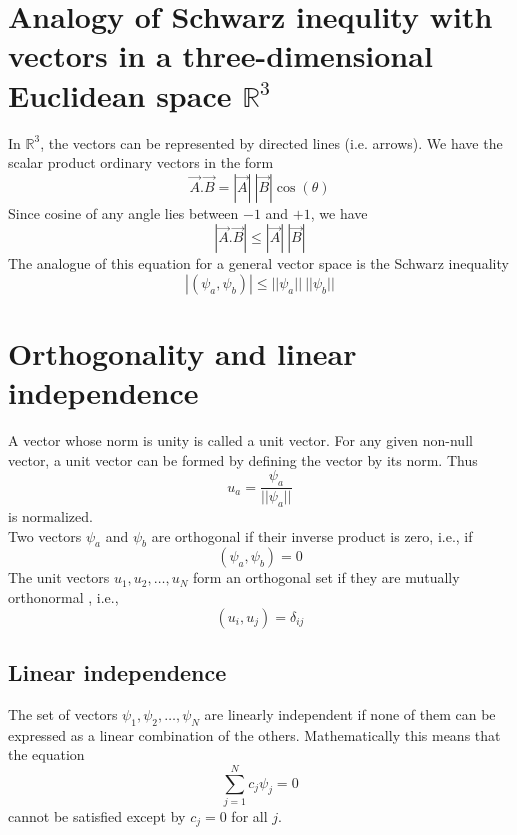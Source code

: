 \section{Analogy of Schwarz inequlity with vectors in a three-dimensional Euclidean space \texorpdfstring{$\mathbb{R}^3$}{Lg}}
In $\mathbb{R}^3$, the vectors can be represented by directed lines (i.e. arrows). We have the scalar product ordinary vectors in the form
\begin{equation}\label{eqn:2.65}
\vec{A} . \vec{B} = |\vec{A}| \ |\vec{B}| \cos(\theta)
\end{equation}
Since cosine of any angle lies between $-1$ and $+1$, we have
\begin{equation}\label{eqn:2.66}
|\vec{A} . \vec{B} | \leq |\vec{A}| \ |\vec{B}|
\end{equation}
The analogue of this equation for a general vector space is the Schwarz inequality
\begin{equation}\label{eqn:2.67}
|(\psi_a, \psi_b)| \leq ||\psi_a|| \ ||\psi_b||
\end{equation}


\section{Orthogonality and linear independence}
A vector whose norm is unity is called a unit vector. For any given non-null vector, a unit vector can be formed by defining the vector by its norm. Thus
\begin{equation}\label{eqn:2.68}
u_a = \frac{\psi_a}{||\psi_a||}
\end{equation}
is normalized.\\
Two vectors $\psi_a$ and $\psi_b$ are orthogonal if their inverse product is zero, i.e., if
\begin{equation}\label{eqn:2.69}
(\psi_a, \psi_b ) = 0
\end{equation}
The unit vectors $u_1, u_2, \ldots, u_N$ form an orthogonal set if they are mutually orthonormal , i.e., 
\begin{equation}\label{eqn:2.70}
(u_i, u_j) = \delta_{ij}
\end{equation}

\subsection{Linear independence}
The set of vectors $\psi_1, \psi_2, \ldots, \psi_N$ are linearly independent if none of them can be expressed as a linear combination of the others. Mathematically this means that the equation
\begin{equation}\label{eqn:2.71}
\sum_{j=1}^{N} c_j \psi_j = 0
\end{equation}	
cannot be satisfied except by $c_j = 0$ for all $j$.

